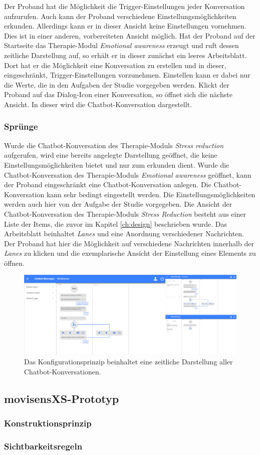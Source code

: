 Der Proband hat die Möglichkeit die Trigger-Einstellungen jeder Konversation aufzurufen. Auch kann der Proband verschiedene Einstellungsmöglichkeiten erkunden. Allerdings kann er in dieser Ansicht keine Einstellungen vornehmen. Dies ist in einer anderen, vorbereiteten Ansicht möglich. Hat der Proband auf der Startseite das Therapie-Modul \emph{Emotional awareness} erzeugt und ruft dessen zeitliche Darstellung auf, so erhält er in dieser zunächst ein leeres Arbeitsblatt. Dort hat er die Möglichkeit eine Konversation zu erstellen und in dieser, eingeschränkt, Trigger-Einstellungen vorzunehmen. Einstellen kann er dabei nur die Werte, die in den Aufgaben der Studie vorgegeben werden. Klickt der Proband auf das Dialog-Icon einer Konversation, so öffnet sich die nächste Ansicht. In dieser wird die Chatbot-Konversation dargestellt. 

\subsubsection{Sprünge}
Wurde die Chatbot-Konversation des Therapie-Moduls \emph{Stress reduction} aufgerufen, wird eine bereits angelegte Darstellung geöffnet, die keine Einstellungsmöglichkeiten bietet und nur zum erkunden dient. Wurde die Chatbot-Konversation des Therapie-Moduls \emph{Emotional awareness} geöffnet, kann der Proband eingeschränkt eine Chatbot-Konversation anlegen. Die Chatbot-Konversation kann sehr bedingt eingestellt werden. Die Einstellungsmöglichkeiten werden auch hier von der Aufgabe der Studie vorgegeben. Die Ansicht der Chatbot-Konversation des Therapie-Moduls \emph{Stress Reduction} besteht aus einer Liste der Items, die zuvor im Kapitel \ref{ch:design} beschrieben wurde. Das Arbeitsblatt beinhaltet \emph{Lanes} und eine Anordnung verschiedener Nachrichten. Der Proband hat hier die Möglichkeit auf verschiedene Nachrichten innerhalb der \emph{Lanes} zu klicken und die exemplarische Ansicht der Einstellung eines Elements zu öffnen.

\begin{figure}[h]
\centering
\includegraphics[width=1\textwidth]{pictures/textset}
\caption{Das Konfigurationsprinzip beinhaltet eine zeitliche Darstellung aller Chatbot-Konversationen.}
\label{textset}
\end{figure}

\subsection{movisensXS-Prototyp}

\subsubsection{Konstruktionsprinzip}

\subsubsection{Sichtbarkeitsregeln}